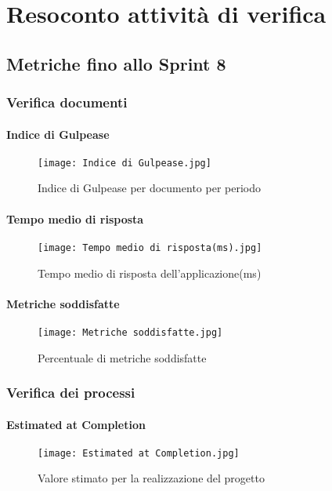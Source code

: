 \chapter{Resoconto attività di verifica}

\section{Metriche fino allo Sprint 8}

  \subsection{Verifica documenti}
    \subsubsection{Indice di Gulpease}
    \begin{figure}[H]
      \centering
      \texttt{[image: Indice di Gulpease.jpg]}
      \caption{Indice di Gulpease per documento per periodo}
    \end{figure}

    \subsubsection{Tempo medio di risposta}
    \begin{figure}[H]
      \centering
      \texttt{[image: Tempo medio di risposta(ms).jpg]}
      \caption{Tempo medio di risposta dell'applicazione(ms)}
    \end{figure}

    \subsubsection{Metriche soddisfatte}
    \begin{figure}[H]
      \centering
      \texttt{[image: Metriche soddisfatte.jpg]}
      \caption{Percentuale di metriche soddisfatte}
    \end{figure}


  \subsection{Verifica dei processi}

    \subsubsection{Estimated at Completion}
    \begin{figure}[H]
      \centering
      \texttt{[image: Estimated at Completion.jpg]}
      \caption{Valore stimato per la realizzazione del progetto}
    \end{figure}


